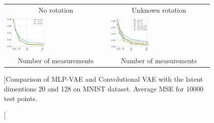 \begin{figure}[t]
    \centering
    \begin{tabular}{ll}
        \multicolumn{1}{c}{No rotation}& \multicolumn{1}{c}{Unknown rotation}\\
        \includegraphics[width=0.39\textwidth]{pics/2_equiv_vae/vae_mse_no_rotation.png} &
        \includegraphics[width=0.39\textwidth]{pics/2_equiv_vae/vae_mse_unknown_rotation_copy.png} \\
        \multicolumn{1}{c}{Number of measurements} &
        \multicolumn{1}{c}{Number of measurements}\\
    \end{tabular}
    \caption[][\baselineskip]{Comparison of MLP-VAE and Convolutional VAE with the latent dimentions 20 and 128 on MNIST dataset. Average MSE for 10000 test points.}
    \label{fig:vae_prior_types}
    \vskip 0.1in
\end{figure}

